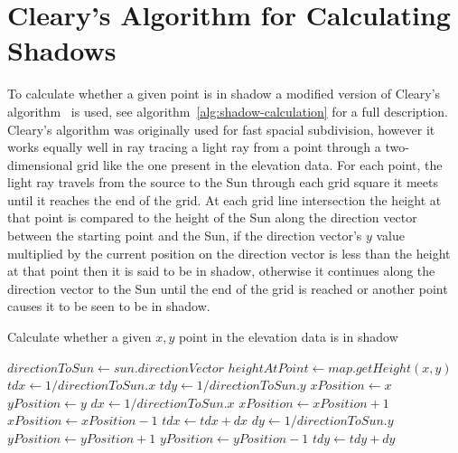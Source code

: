\documentclass[12pt]{report}
\begin{document}
\section{Cleary's Algorithm for Calculating Shadows}
To calculate whether a given point is in shadow a modified version of Cleary's algorithm~\cite{cleary} is used, see algorithm~\ref{alg:shadow-calculation} for a full description. Cleary's algorithm was originally used for fast spacial subdivision, however it works equally well in ray tracing a light ray from a point through a two-dimensional grid like the one present in the elevation data. For each point, the light ray travels from the source to the Sun through each grid square it meets until it reaches the end of the grid. At each grid line intersection the height at that point is compared to the height of the Sun along the direction vector between the starting point and the Sun, if the direction vector's $y$ value multiplied by the current position on the direction vector is less than the height at that point then it is said to be in shadow, otherwise it continues along the direction vector to the Sun until the end of the grid is reached or another point causes it to be seen to be in shadow.

\begin{algorithm}[h]
\caption{Calculate whether a given $x,y$ point in the elevation data is in shadow}
\label{alg:shadow-calculation}%
\begin{algorithmic}           %
\STATE $\mathit{directionToSun} \leftarrow \mathit{sun}.\mathit{directionVector}$
\STATE $\mathit{heightAtPoint} \leftarrow \mathit{map}.\mathit{getHeight}(x,y)$
\STATE $\mathit{tdx} \leftarrow 1 / \mathit{directionToSun}.x$
\STATE $\mathit{tdy} \leftarrow 1 / \mathit{directionToSun}.y$
\STATE $\mathit{xPosition} \leftarrow x$
\STATE $\mathit{yPosition} \leftarrow y$
	\ENDIF
		\STATE $dx \leftarrow 1 / \mathit{directionToSun}.x$
			\STATE $\mathit{xPosition} \leftarrow \mathit{xPosition} + 1$	
		\ELSE
			\STATE $\mathit{xPosition} \leftarrow \mathit{xPosition} - 1$	
		\ENDIF
		\STATE $tdx \leftarrow tdx + dx$
	\ELSE
		\STATE $dy \leftarrow 1 / \mathit{directionToSun}.y$
			\STATE $\mathit{yPosition} \leftarrow \mathit{yPosition} + 1$	
		\ELSE
			\STATE $\mathit{yPosition} \leftarrow \mathit{yPosition} - 1$	
		\ENDIF
		\STATE $tdy \leftarrow tdy + dy$		
	\ENDIF
\ENDWHILE
{}
\end{algorithmic}
\end{algorithm}
\end{document}
